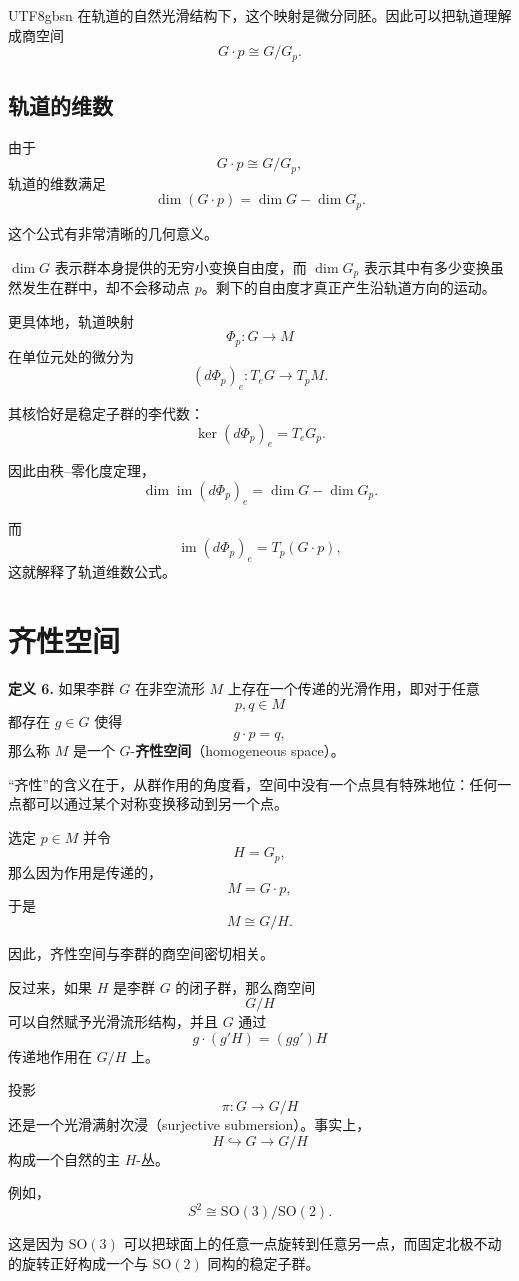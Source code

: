\documentclass[11pt]{article}
\begin{document}
\begin{CJK*}{UTF8}{gbsn}
在轨道的自然光滑结构下，这个映射是微分同胚。因此可以把轨道理解成商空间
\[
G\cdot p\cong G/G_p.
\]


\subsection{轨道的维数}

由于
\[
G\cdot p\cong G/G_p,
\]
轨道的维数满足
\[
\boxed{
\dim(G\cdot p)
=
\dim G-\dim G_p
}.
\]

这个公式有非常清晰的几何意义。

$\dim G$ 表示群本身提供的无穷小变换自由度，而 $\dim G_p$ 表示其中有多少变换虽然发生在群中，却不会移动点 $p$。剩下的自由度才真正产生沿轨道方向的运动。

更具体地，轨道映射
\[
\Phi_p:G\to M
\]
在单位元处的微分为
\[
(d\Phi_p)_e:T_eG\to T_pM.
\]

其核恰好是稳定子群的李代数：
\[
\ker(d\Phi_p)_e
=
T_eG_p.
\]

因此由秩--零化度定理，
\[
\dim\operatorname{im}(d\Phi_p)_e
=
\dim G-\dim G_p.
\]

而
\[
\operatorname{im}(d\Phi_p)_e
=
T_p(G\cdot p),
\]
这就解释了轨道维数公式。


\section{齐性空间}

\textbf{定义 6.}
如果李群 $G$ 在非空流形 $M$ 上存在一个传递的光滑作用，即对于任意
\[
p,q\in M
\]
都存在 $g\in G$ 使得
\[
g\cdot p=q,
\]
那么称 $M$ 是一个 $G$-\textbf{齐性空间}（homogeneous space）。

“齐性”的含义在于，从群作用的角度看，空间中没有一个点具有特殊地位：任何一点都可以通过某个对称变换移动到另一个点。

选定 $p\in M$ 并令
\[
H=G_p,
\]
那么因为作用是传递的，
\[
M=G\cdot p,
\]
于是
\[
M\cong G/H.
\]

因此，齐性空间与李群的商空间密切相关。

反过来，如果 $H$ 是李群 $G$ 的闭子群，那么商空间
\[
G/H
\]
可以自然赋予光滑流形结构，并且 $G$ 通过
\[
g\cdot(g'H)
=
(gg')H
\]
传递地作用在 $G/H$ 上。

投影
\[
\pi:G\to G/H
\]
还是一个光滑满射次浸（surjective submersion）。事实上，
\[
H\hookrightarrow G\longrightarrow G/H
\]
构成一个自然的主 $H$-丛。

例如，
\[
S^2
\cong
\mathrm{SO}(3)/\mathrm{SO}(2).
\]

这是因为 $\mathrm{SO}(3)$ 可以把球面上的任意一点旋转到任意另一点，而固定北极不动的旋转正好构成一个与 $\mathrm{SO}(2)$ 同构的稳定子群。



\end{CJK*}
\end{document}
